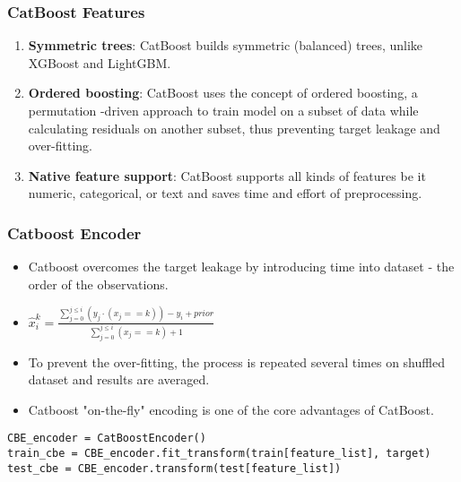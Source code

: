 \documentclass{beamer}
\begin{document}
    \begin{frame}
        \frametitle{CatBoost Features}
        \begin{enumerate}
            \item \textbf{Symmetric trees}: CatBoost builds symmetric (balanced) trees, unlike
            XGBoost and
            LightGBM.
            \pause
            \item \textbf{Ordered boosting}: CatBoost uses the concept of ordered boosting, a
            permutation
            -driven approach to train model on a subset of data while calculating residuals on
            another subset, thus preventing target leakage and over-fitting.
            \pause
            \item \textbf{Native feature support}: CatBoost supports all kinds of features be it
            numeric,
            categorical, or text and saves time and effort of preprocessing.
        \end{enumerate}
    \end{frame}

    \begin{frame}[fragile]
        \frametitle{Catboost Encoder}
        \begin{itemize}
            \item Catboost overcomes the target leakage by introducing time into dataset - the
            order of the observations.
            \pause
            \item $\hat{x}^k_i = \frac{\sum_{j = 0}^{j \leq i} (y_j \cdot (x_j == k)) - y_i +
            prior}{\sum_{j = 0}^{j \leq i} (x_j == k) + 1}$
            \pause
            \item To prevent the over-fitting, the process is repeated several times on shuffled
            dataset and results are averaged.
            \pause
            \item Catboost "on-the-fly" encoding is one of the core advantages of CatBoost.
            \pause
        \end{itemize}

        \begin{lstlisting}
CBE_encoder = CatBoostEncoder()
train_cbe = CBE_encoder.fit_transform(train[feature_list], target)
test_cbe = CBE_encoder.transform(test[feature_list])
        \end{lstlisting}
    \end{frame}
\end{document}
